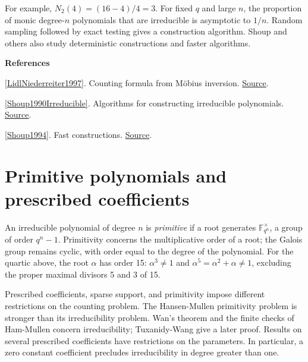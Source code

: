 \documentclass[11pt,a4paper,oneside,openany]{book}
\newcommand{\atlasdisplay}[1]{\par\begingroup\centering\vspace{3pt}\noindent\adjustbox{max width=\linewidth}{\(\displaystyle #1\)}\par\vspace{5pt}\endgroup}
\newenvironment{sources}{\par\smallskip\begingroup\footnotesize\color{atlasgray}\leftskip=10pt\setlength{\parskip}{2pt}}{\par\endgroup\smallskip}
\begin{document}
\atlasdisplay{N_q(n)=\frac1n\sum_{d\mid n}\mu(d)q^{n/d}.}
\color{black} For example, \(N_2(4)=(16-4)/4=3\). For fixed \(q\) and large \(n\), the proportion of monic degree-\(n\) polynomials that are irreducible is asymptotic to \(1/n\). Random sampling followed by exact testing gives a construction algorithm. Shoup and others also study deterministic constructions and faster algorithms.\par
\begin{sources}
\textbf{References}\par\smallskip
\noindent\hyperlink{ref:LidlNiederreiter1997}{[LidlNiederreiter1997]}. Counting formula from Möbius inversion. \href{https://www.cambridge.org/core/books/finite-fields/75BDAA74ABAE713196E718392B9E5E72}{Source}.\par
\noindent\hyperlink{ref:Shoup1990Irreducible}{[Shoup1990Irreducible]}. Algorithms for constructing irreducible polynomials. \href{https://www.shoup.net/papers/detirred.pdf}{Source}.\par
\noindent\hyperlink{ref:Shoup1994}{[Shoup1994]}. Fast constructions. \href{https://doi.org/10.1006/jsco.1994.1025}{Source}.\par
\end{sources}\color{black}
\section{Primitive polynomials and prescribed coefficients}
\color{black} An irreducible polynomial of degree \(n\) is \emph{primitive} if a root generates \(\mathbb F_{q^n}^{\times}\), a group of order \(q^n-1\). Primitivity concerns the multiplicative order of a root; the Galois group remains cyclic, with order equal to the degree of the polynomial. For the quartic above, the root \(\alpha\) has order 15: \(\alpha^3\ne1\) and \(\alpha^5=\alpha^2+\alpha\ne1\), excluding the proper maximal divisors 5 and 3 of 15.\par
\color{black} Prescribed coefficients, sparse support, and primitivity impose different restrictions on the counting problem. The Hansen-Mullen primitivity problem is stronger than its irreducibility problem. Wan's theorem and the finite checks of Ham-Mullen concern irreducibility; Tuxanidy-Wang give a later proof. Results on several prescribed coefficients have restrictions on the parameters. In particular, a zero constant coefficient precludes irreducibility in degree greater than one.\par
\end{document}
